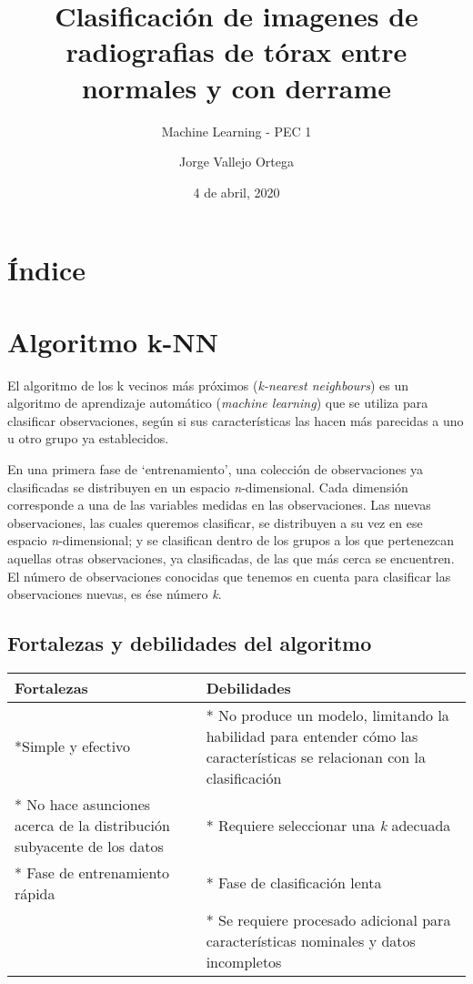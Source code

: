 \documentclass[]{article}
\title{Clasificación de imagenes de radiografias de tórax entre normales y con
derrame}
\subtitle{Machine Learning - PEC 1}
\author{Jorge Vallejo Ortega}
\date{4 de abril, 2020}
\begin{document}
\maketitle

{
\setcounter{tocdepth}{2}
\tableofcontents
}
\section{Índice}\label{uxedndice}

\section{Algoritmo k-NN}\label{algoritmo-k-nn}

El algoritmo de los k vecinos más próximos (\emph{k-nearest neighbours})
es un algoritmo de aprendizaje automático (\emph{machine learning}) que
se utiliza para clasificar observaciones, según si sus características
las hacen más parecidas a uno u otro grupo ya establecidos.

En una primera fase de `entrenamiento', una colección de observaciones
ya clasificadas se distribuyen en un espacio \emph{n}-dimensional. Cada
dimensión corresponde a una de las variables medidas en las
observaciones. Las nuevas observaciones, las cuales queremos clasificar,
se distribuyen a su vez en ese espacio \emph{n}-dimensional; y se
clasifican dentro de los grupos a los que pertenezcan aquellas otras
observaciones, ya clasificadas, de las que más cerca se encuentren. El
número de observaciones conocidas que tenemos en cuenta para clasificar
las observaciones nuevas, es ése número \emph{k}.

\subsection{Fortalezas y debilidades del
algoritmo}\label{fortalezas-y-debilidades-del-algoritmo}

\begin{longtable}[]{@{}ll@{}}
\toprule
Fortalezas & Debilidades\tabularnewline
\midrule
\endhead
*Simple y efectivo & * No produce un modelo, limitando la habilidad para
entender cómo las características se relacionan con la
clasificación\tabularnewline
* No hace asunciones acerca de la distribución subyacente de los datos &
* Requiere seleccionar una \emph{k} adecuada\tabularnewline
* Fase de entrenamiento rápida & * Fase de clasificación
lenta\tabularnewline
& * Se requiere procesado adicional para características nominales y
datos incompletos\tabularnewline
\bottomrule
\end{longtable}
\end{document}
